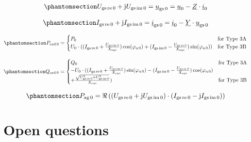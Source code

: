 \documentclass[
  a4paper,
  DIV=11,
  numbers=noendperiod]{scrartcl}
\begin{document}
\begin{equation}\phantomsection\label{eq-ugs0}{
U_\mathrm{gs\,re\,0} + \mathrm{j}U_\mathrm{gs\,im\,0} = \underline{u}_\mathrm{gs\,0} = \underline{u}_0 - \underline{Z} \cdot \underline{i}_0
}\end{equation}

\begin{equation}\phantomsection\label{eq-igs0}{
I_\mathrm{gs\,re\,0} + \mathrm{j}I_\mathrm{gs\,im\,0} = \underline{i}_\mathrm{gs\,0} = \underline{i}_0 - \underline{Y} \cdot \underline{u}_\mathrm{gs\,0}
}\end{equation}

\begin{equation}\phantomsection\label{eq-initPOrd}{
P_\mathrm{ord\,0} = 
\begin{cases}
    P_\mathrm{0} & \text{for Type 3A}\\
    U_\mathrm{0} \cdot ((I_\mathrm{gs\,re\,0} + \frac{U_\mathrm{gs\,im\,0}}{X_\mathrm{eqv}})\cos(\varphi_\mathrm{u\,0}) + (I_\mathrm{gs\,im\,0} - \frac{U_\mathrm{gs\,re\,0}}{X_\mathrm{eqv}})\sin(\varphi_\mathrm{u\,0})) & \text{for Type 3B}
\end{cases}
}\end{equation}

\begin{equation}\phantomsection\label{eq-initQOrd}{
Q_\mathrm{ord\,0} = 
\begin{cases}
    Q_\mathrm{0} & \text{for Type 3A}\\
    -U_\mathrm{0} \cdot ((I_\mathrm{gs\,re\,0} + \frac{U_\mathrm{gs\,im\,0}}{X_\mathrm{eqv}})\sin(\varphi_\mathrm{u\,0}) - (I_\mathrm{gs\,im\,0} - \frac{U_\mathrm{gs\,re\,0}}{X_\mathrm{eqv}})\cos(\varphi_\mathrm{u\,0}) &~\\ 
    + \frac{\sqrt{U_\mathrm{gs\,re\,0}^2+U_\mathrm{gs\,im\,0}^2}}{X_\mathrm{eqv}}) & \text{for Type 3B}
\end{cases}
}\end{equation}

\begin{equation}\phantomsection\label{eq-initPAg}{
P_\mathrm{ag\,0} = \Re \left( (U_\mathrm{gs\,re\,0}+ \mathrm{j}U_\mathrm{gs\,im\,0}) \cdot (I_\mathrm{gs\,re\,0}- \mathrm{j}I_\mathrm{gs\,im\,0}) \right)
}\end{equation}

\section{Open questions}\label{open-questions}
\end{document}
